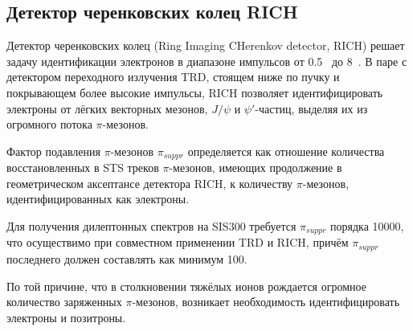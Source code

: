 
\subsection{Детектор черенковских колец RICH}\label{sec:secRICH}

Детектор черенковских колец (Ring Imaging CHerenkov detector, RICH) решает задачу идентификации электронов в диапазоне импульсов от 0.5~\GeVoverC{} до 8~\GeVoverC{}.
В паре с детектором переходного излучения TRD, стоящем ниже по пучку и покрывающем более высокие импульсы, RICH позволяет идентифицировать электроны от лёгких векторных мезонов, $J/\psi$ и $\psi'$-частиц, выделяя их из огромного потока $\pi$-мезонов.

Фактор подавления $\pi$-мезонов $\pi_{suppr}$ определяется как отношение количества восстановленных в STS треков $\pi$-мезонов, имеющих продолжение в геометрическом аксептансе детектора RICH, к количеству $\pi$-мезонов, идентифицированных как электроны.

Для получения дилептонных спектров на SIS300 требуется $\pi_{suppr}$ порядка 10000, что осуществимо при совместном применении TRD и RICH, причём $\pi_{suppr}$ последнего должен составлять как минимум 100.

По той причине, что в столкновении тяжёлых ионов рождается огромное количество заряженных $\pi$-мезонов, возникает необходимость идентифицировать электроны и позитроны.

